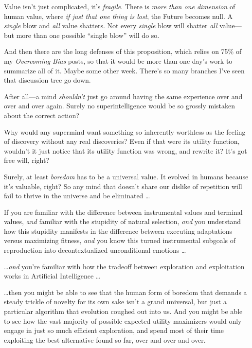 {
 Value isn't just complicated, it's
\textit{fragile}. There is \textit{more than one dimension} of human
value, where \textit{if just that one thing is lost}, the Future
becomes null. A \textit{single} blow and \textit{all} value shatters.
Not every \textit{single} blow will shatter \textit{all} value---but
more than one possible ``single
blow'' will do so.}

{
 And then there are the long defenses of this proposition, which
relies on 75\% of my \textit{Overcoming Bias} posts, so that it would
be more than one day's work to summarize all of it.
Maybe some other week. There's so many branches
I've seen that discussion tree go down.}

{
 After all---a mind \textit{shouldn't} just go
around having the same experience over and over and over again. Surely
no superintelligence would be so grossly mistaken about the correct
action?}

{
 Why would any supermind want something so inherently worthless as
the feeling of discovery without any real discoveries? Even if that
were its utility function, wouldn't it just notice that
its utility function was wrong, and rewrite it? It's
got free will, right?}

{
 Surely, at least \textit{boredom} has to be a universal value. It
evolved in humans because it's valuable, right? So any
mind that doesn't share our dislike of repetition will
fail to thrive in the universe and be eliminated \ldots}

{
 If you are familiar with the difference between instrumental
values and terminal values, \textit{and} familiar with the stupidity of
natural selection, \textit{and} you understand how this stupidity
manifests in the difference between executing adaptations versus
maximizing fitness, \textit{and} you know this turned instrumental
subgoals of reproduction into decontextualized unconditional emotions
\ldots}

{
 \ldots \textit{and} you're familiar with how the
tradeoff between exploration and exploitation works in Artificial
Intelligence \ldots}

{
 \ldots then you might be able to see that the human form of boredom
that demands a steady trickle of novelty for its own sake
isn't a grand universal, but just a particular
algorithm that evolution coughed out into us. And you might be able to
see how the vast majority of possible expected utility maximizers would
only engage in just so much efficient exploration, and spend most of
their time exploiting the best alternative found so far, over and over
and over.}

